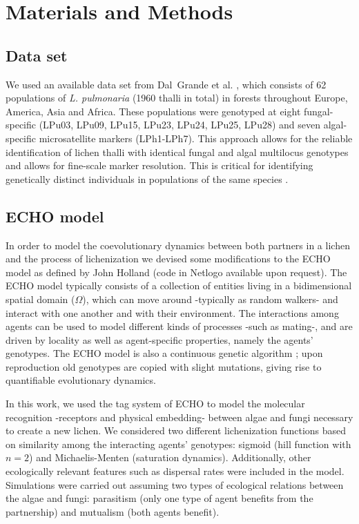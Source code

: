 \documentclass[fleqn,10pt]{wlscirep}
\begin{document}
\section{Materials and Methods}
\label{sec:mat}
\subsection{Data set}
\label{sec:mat:data}
	We used an available data set from Dal~Grande et al. \cite{dal2012vertical}, which consists of 62 populations of \textit{L. pulmonaria} (1960 thalli in total) in forests throughout Europe, America, Asia and Africa. These populations were genotyped at eight fungal-specific (LPu03, LPu09, LPu15, LPu23, LPu24, LPu25, LPu28) and seven algal-specific microsatellite markers (LPh1-LPh7). This approach allows for the reliable identification of lichen thalli with identical fungal and algal multilocus genotypes and allows for fine-scale marker resolution. This is critical for identifying genetically distinct individuals in populations of the same species \cite{dal2012vertical}. 


\subsection{ECHO model}
\label{sec:mat:echo}

In order to model the coevolutionary dynamics between both partners in a lichen and the process of lichenization we devised some modifications to the ECHO model as defined by John Holland \cite{holland1999echoing} (code in Netlogo available upon request). The ECHO model typically consists of a collection of entities living in a bidimensional spatial domain ($\Omega$), which can move around -typically as random walkers- and interact with one another and with their environment. The interactions among agents can be used to model different kinds of processes -such as mating-, and are driven by locality as well as agent-specific properties, namely the agents' genotypes. The ECHO model is also a continuous genetic algorithm \cite{mitchell1998introduction}; upon reproduction old genotypes are copied with slight mutations, giving rise to quantifiable evolutionary dynamics.  

In this work, we used the tag system of ECHO \cite{holland1999echoing} to model the molecular recognition -receptors and physical embedding- between algae and fungi necessary to create a new lichen. We considered two different lichenization functions based on similarity among the interacting agents' genotypes: sigmoid (hill function with $n=2$) and Michaelis-Menten (saturation dynamics). Additionally, other ecologically relevant features such as dispersal rates were included in the model. Simulations were carried out assuming two types of ecological relations between the algae and fungi: parasitism (only one type of agent benefits from the partnership) and mutualism (both agents benefit).
\end{document}
